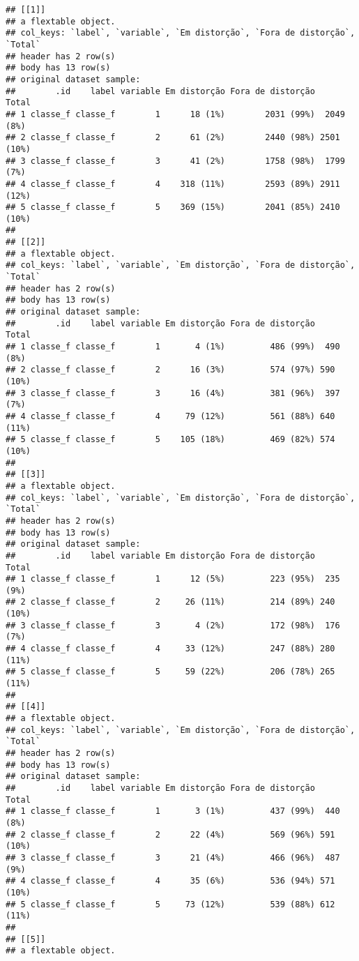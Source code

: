 \documentclass[
]{article}
\begin{document}
\begin{verbatim}
## [[1]]
## a flextable object.
## col_keys: `label`, `variable`, `Em distorção`, `Fora de distorção`, `Total` 
## header has 2 row(s) 
## body has 13 row(s) 
## original dataset sample: 
##        .id    label variable Em distorção Fora de distorção      Total
## 1 classe_f classe_f        1      18 (1%)        2031 (99%)  2049 (8%)
## 2 classe_f classe_f        2      61 (2%)        2440 (98%) 2501 (10%)
## 3 classe_f classe_f        3      41 (2%)        1758 (98%)  1799 (7%)
## 4 classe_f classe_f        4    318 (11%)        2593 (89%) 2911 (12%)
## 5 classe_f classe_f        5    369 (15%)        2041 (85%) 2410 (10%)
## 
## [[2]]
## a flextable object.
## col_keys: `label`, `variable`, `Em distorção`, `Fora de distorção`, `Total` 
## header has 2 row(s) 
## body has 13 row(s) 
## original dataset sample: 
##        .id    label variable Em distorção Fora de distorção     Total
## 1 classe_f classe_f        1       4 (1%)         486 (99%)  490 (8%)
## 2 classe_f classe_f        2      16 (3%)         574 (97%) 590 (10%)
## 3 classe_f classe_f        3      16 (4%)         381 (96%)  397 (7%)
## 4 classe_f classe_f        4     79 (12%)         561 (88%) 640 (11%)
## 5 classe_f classe_f        5    105 (18%)         469 (82%) 574 (10%)
## 
## [[3]]
## a flextable object.
## col_keys: `label`, `variable`, `Em distorção`, `Fora de distorção`, `Total` 
## header has 2 row(s) 
## body has 13 row(s) 
## original dataset sample: 
##        .id    label variable Em distorção Fora de distorção     Total
## 1 classe_f classe_f        1      12 (5%)         223 (95%)  235 (9%)
## 2 classe_f classe_f        2     26 (11%)         214 (89%) 240 (10%)
## 3 classe_f classe_f        3       4 (2%)         172 (98%)  176 (7%)
## 4 classe_f classe_f        4     33 (12%)         247 (88%) 280 (11%)
## 5 classe_f classe_f        5     59 (22%)         206 (78%) 265 (11%)
## 
## [[4]]
## a flextable object.
## col_keys: `label`, `variable`, `Em distorção`, `Fora de distorção`, `Total` 
## header has 2 row(s) 
## body has 13 row(s) 
## original dataset sample: 
##        .id    label variable Em distorção Fora de distorção     Total
## 1 classe_f classe_f        1       3 (1%)         437 (99%)  440 (8%)
## 2 classe_f classe_f        2      22 (4%)         569 (96%) 591 (10%)
## 3 classe_f classe_f        3      21 (4%)         466 (96%)  487 (9%)
## 4 classe_f classe_f        4      35 (6%)         536 (94%) 571 (10%)
## 5 classe_f classe_f        5     73 (12%)         539 (88%) 612 (11%)
## 
## [[5]]
## a flextable object.

\end{verbatim}
\end{document}
